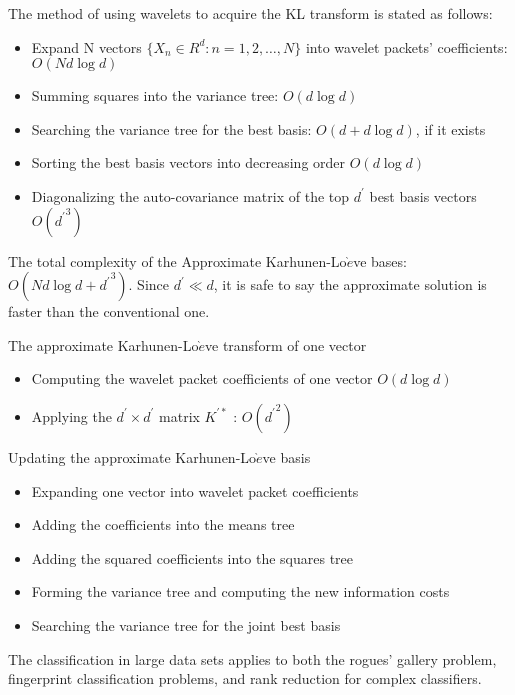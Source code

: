 
The method of using wavelets to acquire the KL transform is stated as follows:  
 \begin{itemize}
\item Expand N vectors $\{X_n \in R^d : n = 1,2, \ldots ,N\}$ into wavelet packets' coefficients: $O(Nd\log d)$
 \item Summing squares into the variance tree: $O(d \log d)$
 \item Searching the variance tree for the best basis: $O(d+d\log d)$, if it exists
 \item Sorting the best basis vectors into decreasing order $O(d \log d)$
 \item Diagonalizing the auto-covariance matrix of the top $d^\prime$ best basis vectors $O({d^\prime}^3)$
\end{itemize}

The total complexity of the Approximate Karhunen-Lo$\grave{e}$ve bases: $O(Nd\log d + {d^\prime}^3)$.  Since $d^\prime \ll d$, it is safe to say the approximate solution is faster than the conventional one. 

The approximate Karhunen-Lo$\grave{e}$ve transform of one vector 
\begin{itemize}
\item Computing the wavelet packet coefficients of one vector $O(d \log d)$
\item Applying the $d^\prime \times d^\prime$ matrix $K^{\prime \ast}$ : $O({d^\prime}^2)$
\end{itemize}

Updating the approximate Karhunen-Lo$\grave{e}$ve basis 
\begin{itemize}
\item Expanding one vector into wavelet packet coefficients 
\item Adding the coefficients into the means tree
\item Adding the squared coefficients into the squares tree
\item Forming the variance tree and computing the new information costs
\item Searching the variance tree for the joint best basis
\end{itemize}

The classification in large data sets applies to both the rogues' gallery problem, fingerprint classification problems, and rank reduction for complex classifiers.  


